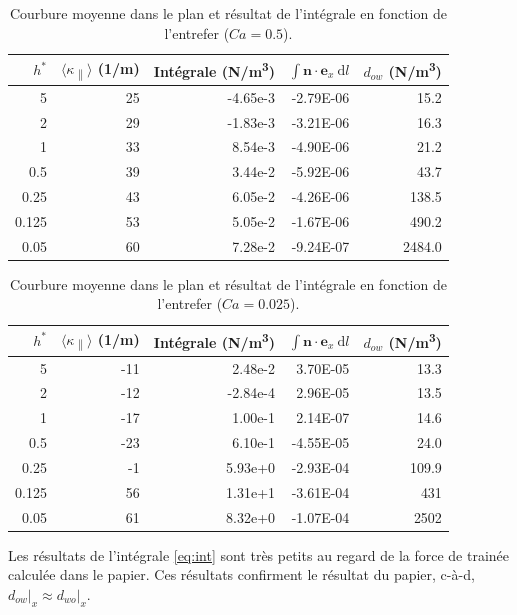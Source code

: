 \documentclass[justified]{tufte-handout}
\begin{document}
\begin{table}[htbp]
\caption{\label{tab:orge94ce7b}Courbure moyenne dans le plan et résultat de l'intégrale en fonction de l'entrefer (\(Ca=0.5\)).}
\centering
\begin{tabular}{rrrrr}
\(h^*\) & \(\langle \kappa\)\textsubscript{\(\parallel\)}\(\rangle\) (1/m) & Intégrale (N/m\textsuperscript{3}) & \(\int \mathbf{n} \cdot \mathbf{e}_x \: \mathrm{d} l\) & \(d_{ow}\) (N/m\textsuperscript{3})\\
\hline
5 & 25 & -4.65e-3 & -2.79E-06 & 15.2\\
2 & 29 & -1.83e-3 & -3.21E-06 & 16.3\\
1 & 33 & 8.54e-3 & -4.90E-06 & 21.2\\
0.5 & 39 & 3.44e-2 & -5.92E-06 & 43.7\\
0.25 & 43 & 6.05e-2 & -4.26E-06 & 138.5\\
0.125 & 53 & 5.05e-2 & -1.67E-06 & 490.2\\
0.05 & 60 & 7.28e-2 & -9.24E-07 & 2484.0\\
\end{tabular}
\end{table}

\begin{table}[htbp]
\caption{\label{tab:org961c12c}Courbure moyenne dans le plan et résultat de l'intégrale en fonction de l'entrefer (\(Ca=0.025\)).}
\centering
\begin{tabular}{rrrrr}
\(h^*\) & \(\langle \kappa\)\textsubscript{\(\parallel\)}\(\rangle\) (1/m) & Intégrale (N/m\textsuperscript{3}) & \(\int \mathbf{n} \cdot \mathbf{e}_x \: \mathrm{d} l\) & \(d_{ow}\) (N/m\textsuperscript{3})\\
\hline
5 & -11 & 2.48e-2 & 3.70E-05 & 13.3\\
2 & -12 & -2.84e-4 & 2.96E-05 & 13.5\\
1 & -17 & 1.00e-1 & 2.14E-07 & 14.6\\
0.5 & -23 & 6.10e-1 & -4.55E-05 & 24.0\\
0.25 & -1 & 5.93e+0 & -2.93E-04 & 109.9\\
0.125 & 56 & 1.31e+1 & -3.61E-04 & 431\\
0.05 & 61 & 8.32e+0 & -1.07E-04 & 2502\\
\end{tabular}
\end{table}

\noindent Les résultats de l'intégrale \ref{eq:int} sont très petits
au regard de la force de trainée calculée dans le papier. Ces
résultats confirment le résultat du papier, c-à-d, \(d_{ow} \vert_x \approx
d_{wo}\vert_x\).
\end{document}
